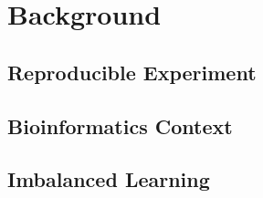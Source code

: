 \chapter{Background}

\section{Reproducible Experiment}


\section{Bioinformatics Context}


\section{Imbalanced Learning}
